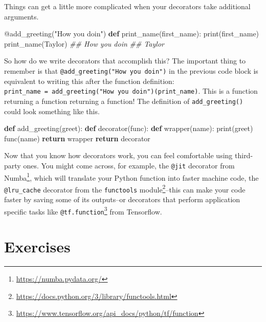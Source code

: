 \documentclass[
  12pt,
  krantz2]{krantz}
\makeatletter
\newenvironment{Shaded}{\begin{snugshade}}{\end{snugshade}}
\newcommand{\AttributeTok}[1]{\textcolor[rgb]{0.61,0.61,0.61}{#1}}
\newcommand{\BuiltInTok}[1]{#1}
\newcommand{\CommentTok}[1]{\textcolor[rgb]{0.37,0.37,0.37}{\textit{#1}}}
\newcommand{\ControlFlowTok}[1]{\textcolor[rgb]{0.27,0.27,0.27}{\textbf{#1}}}
\newcommand{\KeywordTok}[1]{\textcolor[rgb]{0.27,0.27,0.27}{\textbf{#1}}}
\newcommand{\NormalTok}[1]{#1}
\newcommand{\StringTok}[1]{\textcolor[rgb]{0.5,0.5,0.5}{#1}}
\renewcommand{\href}[2]{#2\footnote{\url{#1}}}
\newenvironment{kframe}{%
\medskip{}
\setlength{\fboxsep}{.8em}
 \def\at@end@of@kframe{}%
 \ifinner\ifhmode%
  \def\at@end@of@kframe{\end{minipage}}%
  \begin{minipage}{\columnwidth}%
 \fi\fi%
 \def\FrameCommand##1{\hskip\@totalleftmargin \hskip-\fboxsep
 \colorbox{shadecolor}{##1}\hskip-\fboxsep
     \hskip-\linewidth \hskip-\@totalleftmargin \hskip\columnwidth}%
 \MakeFramed {\advance\hsize-\width
   \@totalleftmargin\z@ \linewidth\hsize
   \@setminipage}}%
 {\par\unskip\endMakeFramed%
 \at@end@of@kframe}
\renewenvironment{Shaded}{\begin{kframe}}{\end{kframe}}
\makeatother
\begin{document}
Things can get a little more complicated when your decorators take additional arguments.

\begin{Shaded}
\begin{Highlighting}[]
\AttributeTok{@add\_greeting}\NormalTok{(}\StringTok{"How you doin\textquotesingle{}"}\NormalTok{)}
\KeywordTok{def}\NormalTok{ print\_name(first\_name):}
    \BuiltInTok{print}\NormalTok{(first\_name)}
\NormalTok{print\_name(}\StringTok{\textquotesingle{}Taylor\textquotesingle{}}\NormalTok{)}
\CommentTok{\#\# How you doin\textquotesingle{}}
\CommentTok{\#\# Taylor}
\end{Highlighting}
\end{Shaded}

So how do we write decorators that accomplish this? The important thing to remember is that \texttt{@add\_greeting("How\ you\ doin\textquotesingle{}")} in the previous code block is equivalent to writing this after the function definition: \texttt{print\_name\ =\ add\_greeting("How\ you\ doin\textquotesingle{}")(print\_name)}. This is a function returning a function returning a function! The definition of \texttt{add\_greeting()} could look something like this.

\begin{Shaded}
\begin{Highlighting}[]
\KeywordTok{def}\NormalTok{ add\_greeting(greet):}
    \KeywordTok{def}\NormalTok{ decorator(func):}
        \KeywordTok{def}\NormalTok{ wrapper(name):}
            \BuiltInTok{print}\NormalTok{(greet)}
\NormalTok{            func(name)}
        \ControlFlowTok{return}\NormalTok{ wrapper}
    \ControlFlowTok{return}\NormalTok{ decorator}
\end{Highlighting}
\end{Shaded}

Now that you know how decorators work, you can feel comfortable using third-party ones. You might come across, for example, the \texttt{@jit} decorator from \href{https://numba.pydata.org/}{Numba}, which will translate your Python function into faster machine code, the \texttt{@lru\_cache} decorator from the \href{https://docs.python.org/3/library/functools.html}{\texttt{functools} module}--this can make your code faster by saving some of its outputs--or decorators that perform application specific tasks like \href{https://www.tensorflow.org/api_docs/python/tf/function}{\texttt{@tf.function}} from Tensorflow.

\hypertarget{exercises-12}{%
\section{Exercises}\label{exercises-12}}
\end{document}
